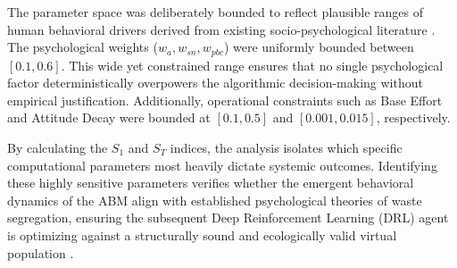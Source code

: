 The parameter space was deliberately bounded to reflect plausible ranges of human behavioral drivers derived from existing socio-psychological literature \citep{Meng2018}. The psychological weights (\(w_a, w_{sn}, w_{pbc}\)) were uniformly bounded between \([0.1, 0.6]\). This wide yet constrained range ensures that no single psychological factor deterministically overpowers the algorithmic decision-making without empirical justification. Additionally, operational constraints such as Base Effort and Attitude Decay were bounded at \([0.1, 0.5]\) and \([0.001, 0.015]\), respectively. 

By calculating the \(S_1\) and \(S_T\) indices, the analysis isolates which specific computational parameters most heavily dictate systemic outcomes. Identifying these highly sensitive parameters verifies whether the emergent behavioral dynamics of the ABM align with established psychological theories of waste segregation, ensuring the subsequent Deep Reinforcement Learning (DRL) agent is optimizing against a structurally sound and ecologically valid virtual population \citep{TianReview2024}.
